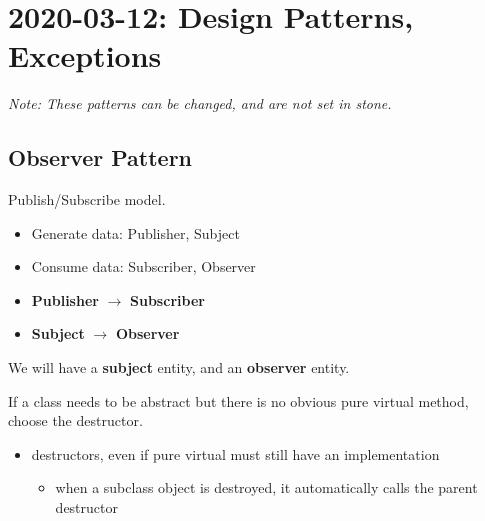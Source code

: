 \section{2020-03-12: Design Patterns, Exceptions}
\emph{Note: These patterns can be changed, and are not set in stone.}
\subsection{Observer Pattern}
Publish/Subscribe model.
\begin{itemize}
    \item Generate data: Publisher, Subject
    \item Consume data: Subscriber, Observer
\end{itemize}
\begin{itemize}
    \item \textbf{Publisher} $ \rightarrow $ \textbf{Subscriber}
    \item \textbf{Subject} $ \rightarrow $ \textbf{Observer}
\end{itemize}
We will have a \textbf{subject} entity, and an \textbf{observer} entity.

\begin{figure}[H]
    \centering
\end{figure}

If a class needs to be abstract but there is no obvious pure virtual method, choose
the destructor.
\begin{itemize}
    \item destructors, even if pure virtual must still have an implementation
          \begin{itemize}
              \item when a subclass object is destroyed, it automatically calls the parent
                    destructor
          \end{itemize}
\end{itemize}

